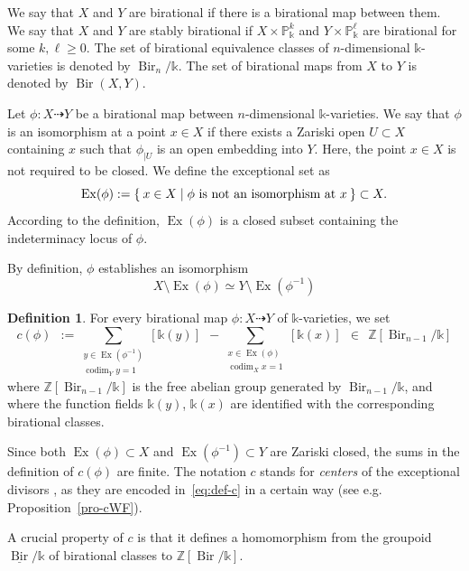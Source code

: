 \documentclass[a4paper,12pt]{amsart}
\def\k{\mathbb k}
\def\P{\mathbb P}
\def\Z{\mathbb Z}
\def\codim{{\operatorname{codim}}}
\def\Bir{{\operatorname{Bir}}}
\def\Ex{{\operatorname{Ex}}}
\theoremstyle{plain}
\numberwithin{equation}{section}
\theoremstyle{definition}
\newtheorem{Def}[dummy]{Definition}
\newcommand{\ul}{\underline}
\newcommand{\cnec}{\mathrel{:=}}
\renewcommand{\(}{\left(}
\renewcommand{\)}{\right)}
\newcommand{\dto}{\dashrightarrow}
\begin{document}
We say that $X$ and $Y$ are birational if there is a birational
map between them. We say that $X$ and $Y$ are stably
birational if $X \times \P_\k^k$ and $Y \times \P_\k^\ell$ are birational
for some $k, \ell \ge 0$.
The set of birational equivalence classes of 
$n$-dimensional
$\k$-varieties
is denoted by $\Bir_n/\k$.
The set of birational maps 
from $X$ to $Y$ is denoted by $\Bir(X,Y)$.

Let $\phi: X \dto Y$ be a birational map between
$n$-dimensional $\k$-varieties.
We say that $\phi$ is an isomorphism at a point 
$x \in X$ if there exists a Zariski open $U \subset X$
containing $x$ such that
$\phi_{|U}$ is an open embedding into $Y$.
Here, the point $x \in X$ is not required to be closed.
We define the exceptional set as
$$\Ex(\phi) \cnec \Set{x \in X | \phi \text{ is not an isomorphism at } x} \subset X.$$
According to the definition, $\Ex(\phi)$ is a closed
subset
containing the indeterminacy locus of $\phi$.

By definition, $\phi$ establishes
an isomorphism
\begin{equation}\label{eq:iso-ex}
X \setminus \Ex(\phi) \simeq Y \setminus \Ex(\phi^{-1})
\end{equation}


\begin{Def}
For every birational map $\phi: X \dto Y$ of $\k$-varieties,
we set
\begin{equation}\label{eq:def-c}
c(\phi) \ \ \cnec 
\sum_{\substack{y \in \Ex(\phi^{-1}) \\ \codim_Y y = 1}} [\k(y)]
 \ \ -  \sum_{\substack{x \in \Ex(\phi) \\ \codim_X x = 1}} [\k(x)] \ \ \in \ \ \Z[\Bir_{n-1}/\k]
 \end{equation}
where $\Z[\Bir_{n-1}/\k]$ 
is the free abelian group generated by $\Bir_{n-1}/\k$,
and where the function fields $\k(y)$, $\k(x)$ are identified
with the corresponding birational classes.
\end{Def}


Since both $\Ex(\phi) \subset X$ 
and $\Ex(\phi^{-1}) \subset Y$ are Zariski closed,
the sums in the definition of $c(\phi)$ are finite.
The notation $c$ stands for \emph{centers}
of the exceptional divisors \cite[Definition 2.24]{KollarMori}, 
as they are
encoded in~\eqref{eq:def-c} 
in a certain way (see e.g. Proposition~\ref{pro-cWF}).

A crucial property
of $c$ is that it defines a homomorphism
from the groupoid $\ul{\Bir}/\k$
of birational classes to
$\Z[\Bir/\k]$.
\end{document}

